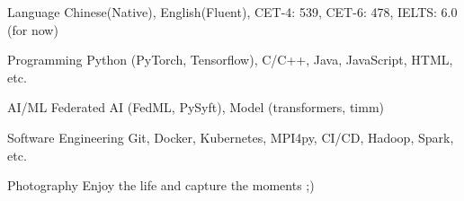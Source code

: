 

\begin{cvskills}

\cvskill
{Language} %
{Chinese(Native), English(Fluent), CET-4: 539, CET-6: 478, IELTS: 6.0 (for now)} %

\cvskill
{Programming} %
{Python (PyTorch, Tensorflow), C/C++, Java, JavaScript, HTML, etc.} %

\cvskill
{AI/ML} %
{Federated AI (FedML, PySyft), Model (transformers, timm)} %


\cvskill
{Software Engineering} %
{Git, Docker, Kubernetes, MPI4py, CI/CD, Hadoop, Spark, etc.} %

\cvskill
{Photography} %
{Enjoy the life and capture the moments ;)} %


\end{cvskills}
